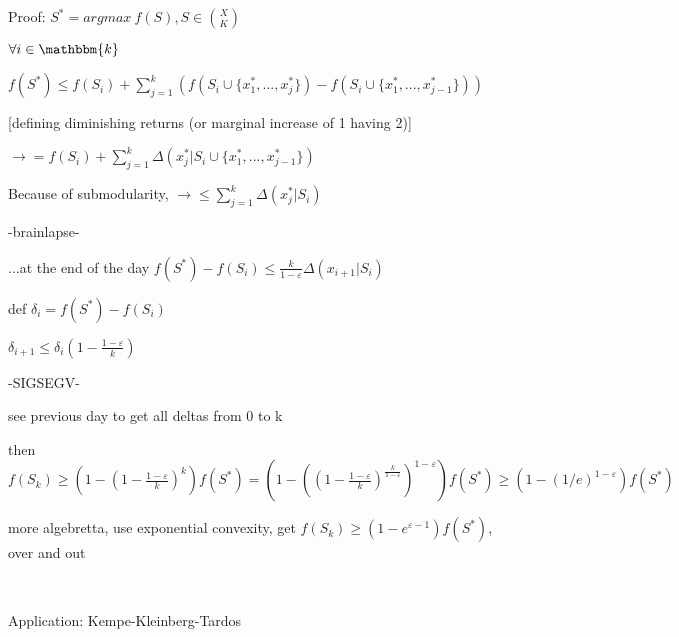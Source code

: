 \documentclass{report}
\begin{document}
	Proof: $S^* = argmax\ f(S), S \in \binom{X}{K}$
	
	$\forall i \in \mathbbm{k}$
	
	$f(S^*) \leq f(S_i) + \sum_{j=1}^{k}(f(S_i \cup\{x_1^*, ..., x_j^*\})-f(S_i \cup\{x_1^*, ..., x_{j-1}^*\}))$
	
	[defining diminishing returns (or marginal increase of {1} having {2})]
	
	$\to = f(S_i)+ \sum_{j=1}^{k}\Delta(x_j^* | S_i \cup \{x_1^*, ..., x_{j-1}^*\})$
	
	Because of submodularity, $\to \leq \sum_{j=1}^{k}\Delta(x_j^* | S_i)$
	
	-brainlapse-
	
	...at the end of the day $f(S^*) - f (S_i) \leq \frac{k}{1-\varepsilon}\Delta(x_{i+1}| S_i)$
	
	def $\delta_i = f(S^*) - f(S_i)$
	
	$\delta_{i+1} \leq \delta_i(1-\frac{1-\varepsilon}{k})$
	
	-SIGSEGV-
	
	see previous day to get all deltas from 0 to k
	
	then $f(S_k) \geq (1-(1-\frac{1-\varepsilon}{k})^k)f(S^*)=(1-((1-\frac{1-\varepsilon}{k})^{\frac{k}{1-\varepsilon}})^{1-\varepsilon})f(S^*) \geq (1-(1/e)^{1-\varepsilon})f(S^*)$
	
	more algebretta, use exponential convexity, get $f(S_k) \geq (1-e^{\varepsilon-1})f(S^*)$, over and out
	
	\
	
	Application: Kempe-Kleinberg-Tardos
	
	
\end{document}
